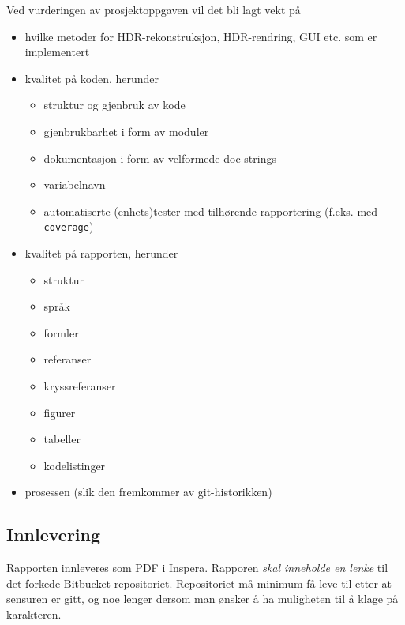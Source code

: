\documentclass[11pt,a4paper]{article}
\begin{document}
Ved vurderingen av prosjektoppgaven vil det bli lagt vekt på
\begin{itemize}[noitemsep]
\item hvilke metoder for HDR-rekonstruksjon, HDR-rendring, GUI etc. som er implementert
\item kvalitet på koden, herunder
  \begin{itemize}[noitemsep]
  \item struktur og gjenbruk av kode
  \item gjenbrukbarhet i form av moduler
  \item dokumentasjon i form av velformede doc-strings
  \item variabelnavn
  \item automatiserte (enhets)tester med tilhørende rapportering (f.eks. med \texttt{coverage})
  \end{itemize}
\item kvalitet på rapporten, herunder
  \begin{itemize}[noitemsep]
  \item struktur
  \item språk
  \item formler
  \item referanser
  \item kryssreferanser
  \item figurer
  \item tabeller
  \item kodelistinger
  \end{itemize}
\item prosessen (slik den fremkommer av git-historikken)
\end{itemize}

\subsection{Innlevering}

Rapporten innleveres som PDF i Inspera. Rapporen \emph{skal inneholde en lenke} til det forkede Bitbucket-repositoriet. Repositoriet må minimum få leve til etter at sensuren er gitt, og noe lenger dersom man ønsker å ha muligheten til å klage på karakteren.



\end{document}
